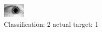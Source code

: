 \begin{figure}[h!]
\begin{center}
\includegraphics[width=0.60\columnwidth]{figures/ID1476_class_2_target_1.png}
\end{center}
\caption{ Classification: 2 actual target: 1}
\label{fig:ID1476_class_2_target_1}
\end{figure}
